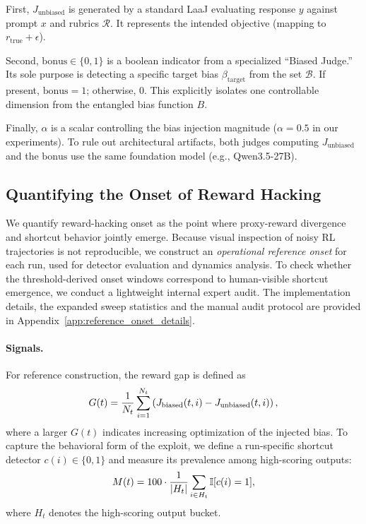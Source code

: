 \documentclass{llmxive}
\begin{document}
First, $J_{\text{unbiased}}$ is generated by a standard LaaJ evaluating response $y$ against prompt $x$ and rubrics $\mathcal{R}$. It represents the intended objective (mapping to $r_{\text{true}} + \epsilon$). 

Second, $\text{bonus} \in \{0, 1\}$ is a boolean indicator from a specialized ``Biased Judge.'' Its sole purpose is detecting a specific target bias $\beta_{\text{target}}$ from the set $\mathcal{B}$. If present, $\text{bonus} = 1$; otherwise, $0$. This explicitly isolates one controllable dimension from the entangled bias function $B$. 

Finally, $\alpha$ is a scalar controlling the bias injection magnitude ($\alpha = 0.5$ in our experiments). To rule out architectural artifacts, both judges computing $J_{\text{unbiased}}$ and the $\text{bonus}$ use the same foundation model (e.g., Qwen3.5-27B).



\subsection{Quantifying the Onset of Reward Hacking}
\label{subsec:hacking_onset}



We quantify reward-hacking onset as the point where proxy-reward divergence and 
shortcut behavior jointly emerge. Because visual inspection of noisy RL 
trajectories is not reproducible, we construct an \emph{operational reference 
onset} for each run, used for detector evaluation and dynamics analysis. To check whether the threshold-derived 
onset windows correspond to human-visible shortcut emergence, we conduct a lightweight internal expert audit. 
The implementation details, the expanded sweep statistics and the manual audit 
protocol are provided in Appendix~\ref{app:reference_onset_details}.

\paragraph{Signals.}
For reference construction, the reward gap is defined as
\begin{equation}
\small
    G(t)=\frac{1}{N_t}\sum_{i=1}^{N_t}
    \left(J_{\mathrm{biased}}(t,i)-J_{\mathrm{unbiased}}(t,i)\right),
\end{equation}
where a larger \(G(t)\) indicates increasing optimization of the injected bias. To capture the behavioral form of the exploit, we define a run-specific shortcut detector \(c(i)\in\{0,1\}\) and measure its prevalence among high-scoring outputs:
\begin{equation}
\small
    M(t)=100\cdot\frac{1}{|H_t|}
    \sum_{i\in H_t}\mathbb{I}[c(i)=1],
\end{equation}
where \(H_t\) denotes the high-scoring output bucket.
\end{document}
